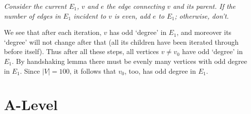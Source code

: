 \documentclass[11pt,a4paper]{article}
\begin{document}
\begin{enumerate}
	\emph{Consider the current $E_1$, $v$ and $e$ the edge connecting $v$ and its parent. If the number of edges in $E_1$ incident to $v$ is even, add $e$ to $E_1$; otherwise, don't.}
	
	We see that after each iteration, $v$ has odd `degree' in $E_1$, and moreover its `degree' will not change after that (all its children have been iterated through before itself). Thus after all these steps, all vertices $v\neq v_0$ have odd `degree' in $E_1$. By handshaking lemma there must be evenly many vertices with odd degree in $E_1$. Since $|V|=100$, it follows that $v_0$, too, has odd degree in $E_1$. 
\end{enumerate}

\section*{A-Level}
\end{document}
